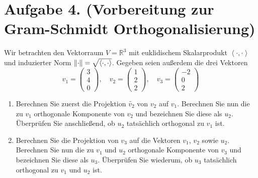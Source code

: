\documentclass[german,12pt]{homework}
\newcommand{\RR}{\mathbb{R}}
\newcommand{\dotproduct}[2]{\left\langle#1, #2\right\rangle}
\DeclarePairedDelimiter{\norm}{\lVert}{\rVert}
\begin{document}
    \section*{Aufgabe 4. (Vorbereitung zur Gram-Schmidt Orthogonalisierung)}

    \begin{problem}
        Wir betrachten den Vektorraum \(V = \RR^3\) mit euklidischem
        Skalarprodukt \(\dotproduct{\cdot}{\cdot}\) und induzierter Norm
        \(\norm*{\cdot} = \sqrt{\dotproduct{\cdot}{\cdot}}\). Gegeben seien
        außerdem die drei Vektoren
        \[v_1 = \begin{pmatrix}3\\4\\0\end{pmatrix}, \quad v_2 =
        \begin{pmatrix}1\\2\\2\end{pmatrix}, \quad v_3 = \begin{pmatrix}
        -2\\0\\2\end{pmatrix}\]
        \begin{enumerate}
            \item Berechnen Sie zuerst die Projektion \(\tilde{v_2}\) von
            \(v_2\) auf \(v_1\). Berechnen Sie nun die zu \(v_1\) orthogonale
            Komponente von \(v_2\) und bezeichnen Sie diese als \(u_2\).
            Überprüfen Sie anschließend, ob \(u_2\) tatsächlich orthogonal zu
            \(v_1\) ist.
            \item Berechnen Sie die Projektion von \(v_3\) auf die Vektoren
            \(v_1\), \(v_2\) sowie \(u_2\). Berechnen Sie nun die zu \(v_1\)
            und \(u_2\) orthogonale Komponente von \(v_3\) und bezeichnen Sie
            diese als \(u_3\). Überprüfen Sie wiederum, ob \(u_3\) tatsächlich
            orthogonal zu \(v_1\) und \(u_2\) ist.
        \end{enumerate}
    \end{problem}
\end{document}

